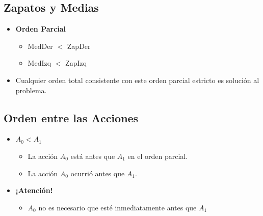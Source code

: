 \documentclass[11pt]{article}
\begin{document}
\subsection*{Zapatos y Medias}
\label{sec:org8d18f41}

\begin{itemize}
\item \textbf{{\color{green}Orden Parcial}}
\begin{itemize}
\item {\color{red}MedDer \(<\) ZapDer}
\item {\color{red}MedIzq \(<\) ZapIzq}
\end{itemize}
\item Cualquier orden total consistente con este orden parcial estricto
es solución al problema.
\end{itemize}




\subsection*{Orden entre las Acciones}
\label{sec:org6ef2727}

\begin{itemize}
\item \textbf{{\color{green}\(A_0 < A_1\)}}
\begin{itemize}
\item La acción \(A_0\)  está antes que \(A_1\) en el orden parcial.
\item La acción \(A_0\)  ocurrió antes que \(A_1\).
\end{itemize}
\item \textbf{{\color{green}¡Atención!}}
\begin{itemize}
\item \(A_0\)  {\color{red}no} es necesario que esté inmediatamente antes que \(A_1\)
\end{itemize}
\end{itemize}
\end{document}
